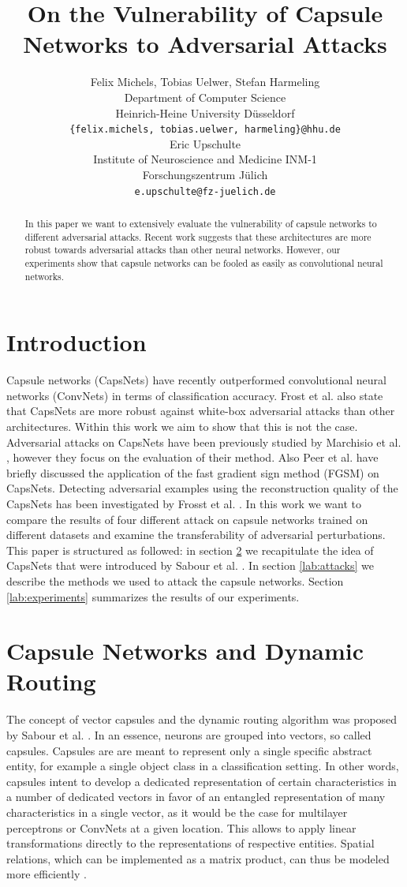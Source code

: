 \documentclass{article}
\title{On the Vulnerability of Capsule Networks to Adversarial Attacks}
\author{%
  Felix Michels, Tobias Uelwer, Stefan Harmeling \\
  Department of Computer Science\\
  Heinrich-Heine University Düsseldorf\\
  \texttt{\{felix.michels, tobias.uelwer, harmeling\}@hhu.de} \\
  \And
  Eric Upschulte \\
  Institute of Neuroscience and Medicine INM-1\\
  Forschungszentrum Jülich \\
  \texttt{e.upschulte@fz-juelich.de} \\
}
\begin{document}
\maketitle

\begin{abstract}
	In this paper we want to extensively evaluate the vulnerability of capsule networks to different adversarial attacks. Recent work suggests that these architectures are more robust towards adversarial attacks than other neural networks. However, our experiments show that capsule networks can be fooled as easily as convolutional neural networks.

\end{abstract}

\section{Introduction}
Capsule networks (CapsNets)\cite{capsules} have recently outperformed convolutional neural networks (ConvNets) in terms of classification accuracy. Frost et al. \cite{darccc} also state that CapsNets are more robust against white-box adversarial attacks than other architectures. Within this work we aim to show that this is not the case. Adversarial attacks on CapsNets have been previously studied by Marchisio et al. \cite{marchisio}, however they focus on the evaluation of their method. Also Peer et al. \cite{training} have briefly discussed the application of the fast gradient sign method (FGSM) \cite{fgsm} on CapsNets. Detecting adversarial examples using the reconstruction quality of the CapsNets has been investigated by Frosst et al. \cite{darccc}. In this work we want to compare the results of four different attack on capsule networks trained on different datasets and examine the transferability of adversarial perturbations. This paper is structured as followed: in section \ref{lab:capsules} we recapitulate the idea of CapsNets that were introduced by Sabour et al. \cite{capsules}. In section \ref{lab:attacks} we describe the methods we used to attack the capsule networks. Section \ref{lab:experiments} summarizes the results of our experiments.

\section{Capsule Networks and Dynamic Routing}
\label{lab:capsules}
The concept of vector capsules and the dynamic routing algorithm was proposed by Sabour et al. \cite{capsules}. In an essence, neurons are grouped into vectors, so called capsules. Capsules are are meant to represent only a single specific abstract entity, for example a single object class in a classification setting.
In other words, capsules intent to develop a dedicated representation of certain characteristics in a number of dedicated vectors in favor of an entangled representation of many characteristics in a single vector, as it would be the case for multilayer perceptrons or ConvNets at a given location. This allows to apply linear transformations directly to the representations of respective entities. Spatial relations, which can be implemented as a matrix product, can thus be modeled more efficiently \cite{capsules}.
\end{document}
